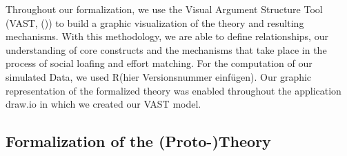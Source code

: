 \documentclass[
  man,
  longtable,
  a4paper,
  nolmodern,
  notxfonts,
  notimes,
  colorlinks=true,linkcolor=blue,citecolor=blue,urlcolor=blue]{apa7}
\begin{document}
Throughout our formalization, we use the Visual Argument Structure Tool
(VAST, ()) to build a
graphic visualization of the theory and resulting mechanisms. With this
methodology, we are able to define relationships, our understanding of
core constructs and the mechanisms that take place in the process of
social loafing and effort matching. For the computation of our simulated
Data, we used R(hier Versionsnummer einfügen). Our graphic
representation of the formalized theory was enabled throughout the
application draw.io in which we created our VAST model.

\subsection{Formalization of the
(Proto-)Theory}\label{formalization-of-the-proto-theory}
\end{document}
